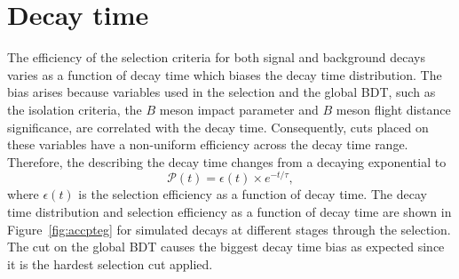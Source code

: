 \section{Decay time \pdfs}
\label{sec:DTpdfs}
The efficiency of the selection criteria for both signal and background decays varies as a function of decay time which biases the decay time distribution. The bias arises because variables used in the selection and the global BDT, such as the isolation criteria, the $B$ meson impact parameter and $B$ meson flight distance significance, are correlated with the decay time. Consequently, cuts placed on these variables have a non-uniform efficiency across the decay time range. Therefore, the \pdf describing the decay time changes from a decaying exponential to
\begin{equation}
\mathcal{P}(t) = \epsilon(t) \times e^{-t/\tau},
\label{eq:DTpdf}
\end{equation}
where $\epsilon(t)$ is the selection efficiency as a function of decay time. 
The decay time distribution and selection efficiency as a function of decay time are shown in Figure~\ref{fig:accpteg} for simulated \bsmumu decays at different stages through the selection. The cut on the global BDT causes the biggest decay time bias as expected since it is the hardest selection cut applied. %
